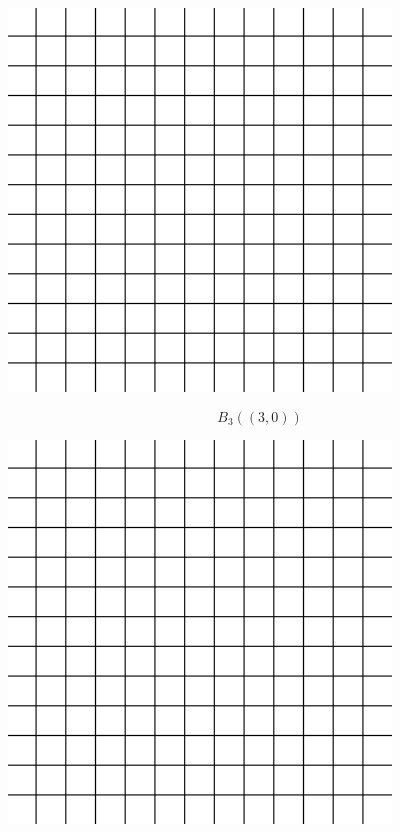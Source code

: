 \documentclass[12pt]{article}
\begin{document}
\begin{center} \includegraphics[width=4in]{grid.png}\\ \end{center}
\newpage
$$B_3((3,0))$$

\begin{center} \includegraphics[width=4in]{grid.png}\\ \end{center}





\newpage
\end{document}
